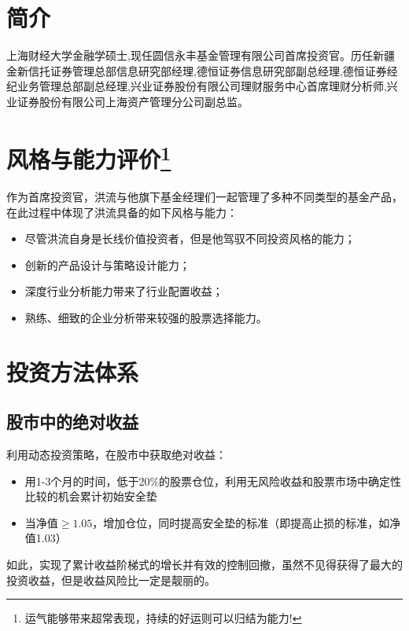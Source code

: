 \documentclass[journal=jacsat,manuscript=article]{achemso}
\providecommand{\tightlist}{%
  \setlength{\itemsep}{0pt}\setlength{\parskip}{0pt}}
\begin{document}
\section{简介}

上海财经大学金融学硕士,现任圆信永丰基金管理有限公司首席投资官。历任新疆金新信托证券管理总部信息研究部经理,德恒证券信息研究部副总经理,德恒证券经纪业务管理总部副总经理,兴业证券股份有限公司理财服务中心首席理财分析师,兴业证券股份有限公司上海资产管理分公司副总监。

\section{\texorpdfstring{风格与能力评价\footnote{运气能够带来超常表现，持续的好运则可以归结为能力!}}{风格与能力评价}}

作为首席投资官，洪流与他旗下基金经理们一起管理了多种不同类型的基金产品，在此过程中体现了洪流具备的如下风格与能力：

\begin{itemize}
\tightlist
\item
  尽管洪流自身是长线价值投资者，但是他驾驭不同投资风格的能力；
\item
  创新的产品设计与策略设计能力；
\item
  深度行业分析能力带来了行业配置收益；
\item
  熟练、细致的企业分析带来较强的股票选择能力。
\end{itemize}

\section{投资方法体系}

\subsection{股市中的绝对收益}

利用动态投资策略，在股市中获取绝对收益：

\begin{itemize}
\item
  用1-3个月的时间，低于20\%的股票仓位，利用无风险收益和股票市场中确定性比较的机会累计初始安全垫
\item
  当净值\(\geq 1.05\)，增加仓位，同时提高安全垫的标准（即提高止损的标准，如净值1.03）
\end{itemize}

如此，实现了累计收益阶梯式的增长并有效的控制回撤，虽然不见得获得了最大的投资收益，但是收益风险比一定是靓丽的。
\end{document}
